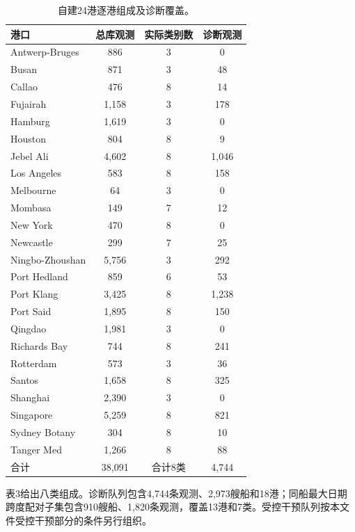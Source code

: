 \documentclass[journal,10pt,a4paper]{IEEEtran}
\begin{document}
\begin{table}[H]
\centering\footnotesize
\setcounter{table}{1}
\caption{自建24港逐港组成及诊断覆盖。}
\label{tab:2}
\setlength{\tabcolsep}{3pt}\renewcommand{\arraystretch}{1.2}
\begin{tabularx}{\linewidth}{LCCC}
\toprule
港口 & 总库观测 & 实际类别数 & 诊断观测 \\
\midrule
Antwerp-Bruges & 886 & 3 & 0 \\
Busan & 871 & 3 & 48 \\
Callao & 476 & 8 & 14 \\
Fujairah & 1,158 & 3 & 178 \\
Hamburg & 1,619 & 3 & 0 \\
Houston & 804 & 8 & 9 \\
Jebel Ali & 4,602 & 8 & 1,046 \\
Los Angeles & 583 & 8 & 158 \\
Melbourne & 64 & 3 & 0 \\
Mombasa & 149 & 7 & 12 \\
New York & 470 & 8 & 0 \\
Newcastle & 299 & 7 & 25 \\
Ningbo-Zhoushan & 5,756 & 3 & 292 \\
Port Hedland & 859 & 6 & 53 \\
Port Klang & 3,425 & 8 & 1,238 \\
Port Said & 1,895 & 8 & 150 \\
Qingdao & 1,981 & 3 & 0 \\
Richards Bay & 744 & 8 & 241 \\
Rotterdam & 573 & 3 & 36 \\
Santos & 1,658 & 8 & 325 \\
Shanghai & 2,390 & 3 & 0 \\
Singapore & 5,259 & 8 & 821 \\
Sydney Botany & 304 & 8 & 10 \\
Tanger Med & 1,266 & 8 & 88 \\
合计 & 38,091 & 合计8类 & 4,744 \\
\bottomrule
\end{tabularx}
\end{table}

表3给出八类组成。诊断队列包含4,744条观测、2,973艘船和18港；同船最大日期跨度配对子集包含910艘船、1,820条观测，覆盖13港和7类。受控干预队列按本文件受控干预部分的条件另行组织。
\end{document}
